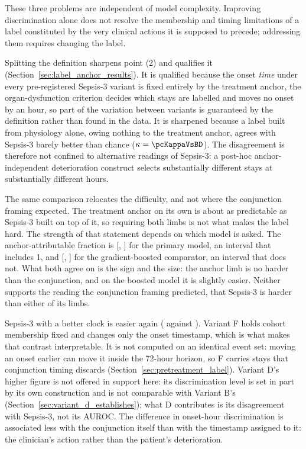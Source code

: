 These three problems are independent of model complexity. Improving
discrimination alone does not resolve the membership and timing limitations of
a label constituted by the very clinical actions it is supposed to precede;
addressing them requires changing the label.

Splitting the definition sharpens point (2) and qualifies it
(Section~\ref{sec:label_anchor_results}). It is qualified because the onset
\emph{time} under every pre-registered Sepsis-3 variant is fixed entirely by the
treatment anchor, the organ-dysfunction criterion decides which stays are
labelled and moves no onset by an hour, so part of the variation between
variants is guaranteed by the definition rather than found in the data. It is
sharpened because a label built from physiology alone, owing nothing to the
treatment anchor, agrees with Sepsis-3 barely better than chance
($\kappa = \pcKappaVsBD$). The disagreement is therefore not confined to
alternative readings of Sepsis-3: a post-hoc anchor-independent deterioration
construct selects substantially different stays at substantially different
hours.

The same comparison relocates the difficulty, and not where the conjunction
framing expected. The treatment anchor on its own is about as predictable as
Sepsis-3 built on top of it, so requiring both limbs is not what makes the
label hard. The strength of that statement depends on which model is asked. The
anchor-attributable fraction is \pcPhiAnchorPrimary{}
[\pcPhiAnchorCiLoPrimary, \pcPhiAnchorCiHiPrimary] for the primary model, an
interval that includes 1, and \pcPhiAnchorGbt{}
[\pcPhiAnchorCiLoGbt, \pcPhiAnchorCiHiGbt] for the gradient-boosted
comparator, an interval that does not. What both agree on is the sign and the
size: the anchor limb is no harder than the conjunction, and on the boosted
model it is slightly easier. Neither supports the reading the conjunction
framing predicted, that Sepsis-3 is harder than either of its limbs.

Sepsis-3 with a better clock is easier again (\pcAltAurocFullPrimaryF{} against
\pcAurocPrimaryB). Variant F holds cohort membership fixed and changes only the
onset timestamp, which is what makes that contrast interpretable. It is not
computed on an identical event set: moving an onset earlier can move it inside
the 72-hour horizon, so F carries \pcFNExtraInHorizon{} stays that conjunction
timing discards (Section~\ref{sec:pretreatment_label}). Variant D's higher figure is not offered in
support here: its discrimination level is set in part by its own construction
and is not comparable with Variant B's
(Section~\ref{sec:variant_d_establishes}); what D contributes is its
disagreement with Sepsis-3, not its AUROC. The difference in onset-hour discrimination is associated less with the
conjunction itself than with the timestamp assigned to it: the clinician's
action rather than the patient's deterioration.


